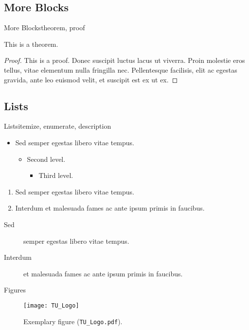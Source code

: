 \documentclass{beamer}
\begin{document}
\subsection{More Blocks}
\begin{frame}{More Blocks}{theorem, proof}
  \begin{theorem}
    This is a theorem.
  \end{theorem}
  \begin{proof}
    This is a proof.  Donec suscipit luctus lacus ut viverra. Proin molestie
    eros tellus, vitae elementum nulla fringilla nec. Pellentesque facilisis,
    elit ac egestas gravida, ante leo euismod velit, et suscipit est ex ut ex.
  \end{proof}
\end{frame}

\subsection{Lists}
\begin{frame}{Lists}{itemize, enumerate, description}
  \begin{itemize}
  \item Sed semper egestas libero vitae tempus.
    \begin{itemize}
    \item Second level.
      \begin{itemize}
      \item Third level.
      \end{itemize}
    \end{itemize}
  \end{itemize}

  \begin{enumerate}
  \item Sed semper egestas libero vitae tempus.
  \item Interdum et malesuada fames ac ante ipsum primis in faucibus.
  \end{enumerate}

  \begin{description}
  \item[Sed] semper egestas libero vitae tempus.
  \item[Interdum] et malesuada fames ac ante ipsum primis in faucibus.
  \end{description}
\end{frame}

\begin{frame}{Figures}{}
  \begin{figure}
    \centering
    \texttt{[image: TU\_Logo]}
    \caption{Exemplary figure (\texttt{TU\_Logo.pdf}).}
    \label{fig:test}
  \end{figure}
\end{frame}
\end{document}
